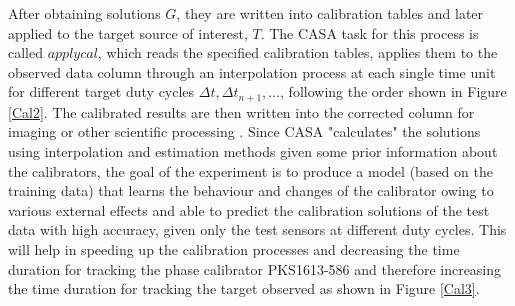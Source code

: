 %
 
After obtaining solutions $G$, they are written into calibration tables and later applied to the target source of interest, $T$. The CASA task for this process is called $\textit{applycal}$, which reads the specified calibration tables, applies them to the observed data column through an interpolation process at each single time unit for different target duty cycles $\Delta t, \Delta t_{n+1},\dots$, following the order shown in Figure \ref{Cal2}. The calibrated results are then written into the corrected column for imaging or other scientific processing \citep{ott2013casa}. Since CASA "calculates" the solutions using interpolation and estimation methods given some prior information about the calibrators, the goal of the experiment is to produce a model (based on the training data) that learns the behaviour and changes of the calibrator owing to various external effects and able to predict the calibration solutions of the test data with high accuracy, given only the test sensors at different duty cycles. This will help in speeding up the calibration processes and decreasing the time duration for tracking the phase calibrator PKS1613-586 and therefore increasing the time duration for tracking the target observed as shown in Figure \ref{Cal3}. 

